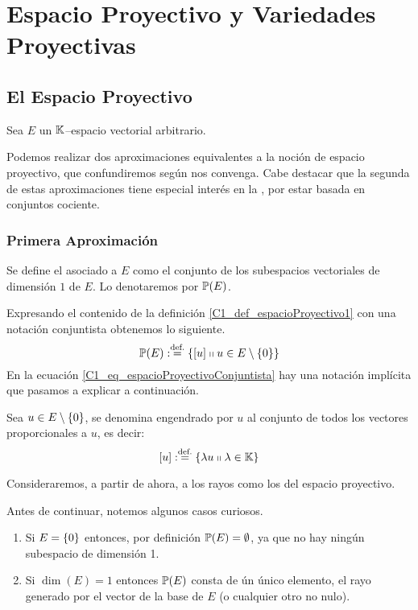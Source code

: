 \chapter{Espacio Proyectivo y Variedades Proyectivas}
\label{C1}
\section{El Espacio Proyectivo}
\label{C1_espacioProyectivo}
Sea $E$ un $\mathbb{K}$--espacio vectorial arbitrario.

Podemos realizar dos aproximaciones equivalentes a la noción de espacio proyectivo, que confundiremos según nos convenga. Cabe destacar que la segunda de estas aproximaciones tiene especial interés en la , por estar basada en conjuntos cociente.
\subsection{Primera Aproximación}
\label{C1_S1_primeraAprox}
\begin{defi}
	\label{C1_def_espacioProyectivo1}
	Se define el  asociado a $E$ como el conjunto de los subespacios vectoriales de dimensión $1$ de $E$. Lo denotaremos por $\mathbb{P}(E)$.
\end{defi}
Expresando el contenido de la definición \ref{C1_def_espacioProyectivo1} con una notación conjuntista obtenemos lo siguiente.
\begin{equation}
\label{C1_eq_espacioProyectivoConjuntista}
	\mathbb{P}(E):\stackrel{\textrm{def.}}{=}\{\left [ u \right ]\shortparallel u\in E\setminus\{0\}\}
\end{equation}
En la ecuación \ref{C1_eq_espacioProyectivoConjuntista} hay una notación implícita que pasamos a explicar a continuación.
\begin{defi}[Rayo]
	\label{C1_def_rayo}
	Sea $u\in E\setminus\{0\}$, se denomina  engendrado por $u$ al conjunto de todos los vectores proporcionales a $u$, es decir:
	\[\left [ u \right ]:\stackrel{\textrm{def.}}{=}\{\lambda u\shortparallel \lambda\in\mathbb{K}\}\] 
\end{defi}
Consideraremos, a partir de ahora, a los rayos como los  del espacio proyectivo.

Antes de continuar, notemos algunos casos curiosos.
\begin{obs}
	\label{C1_obs_casosExtremos}
	\begin{enumerate}
		\item Si $E=\{0\}$ entonces, por definición $\mathbb{P}(E)=\emptyset$, ya que no hay ningún subespacio de dimensión 1.
		\item Si $\dim(E)=1$ entonces $\mathbb{P}(E)$ consta de ún único elemento, el rayo generado por el vector de la base de $E$ (o cualquier otro no nulo).
	\end{enumerate}
\end{obs}
